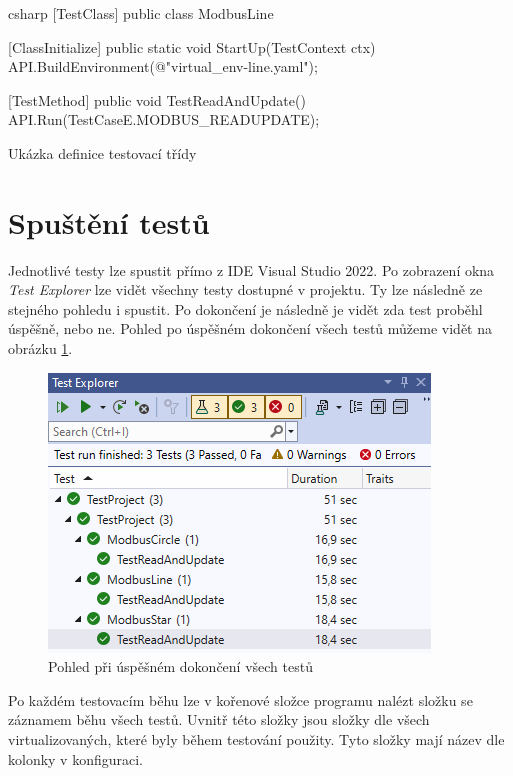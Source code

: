 \begin{listing}[htbp]
    \centering
    \begin{cminted}[breaklines,autogobble, fontsize=\footnotesize]{csharp}
        [TestClass]
        public class ModbusLine
        {
    
            [ClassInitialize]
            public static void StartUp(TestContext ctx)
            {
                API.BuildEnvironment(@"virtual_env\modbus\topologies\modbus-line.yaml");
            }
    
            [TestMethod]
            public void TestReadAndUpdate()
            {
                API.Run(TestCaseE.MODBUS_READUPDATE);
            }
        }
    \end{cminted}
\caption{Ukázka definice testovací třídy}
\label{listing:test_class}
\end{listing}


\section{Spuštění testů}

Jednotlivé testy lze spustit přímo z IDE Visual Studio 2022\cite{vs2022}. Po zobrazení okna \textit{Test Explorer} lze vidět všechny testy dostupné v projektu. Ty lze následně ze stejného pohledu i spustit. Po dokončení je následně je vidět zda test proběhl úspěšně, nebo ne. Pohled po úspěšném dokončení všech testů můžeme vidět na obrázku \ref{fig:modbus_test_success}. 

\begin{figure}[htbp]
    \centering 
    \includegraphics{assets/img/modbus_test.png}
    \caption{Pohled při úspěšném dokončení všech testů}
    \label{fig:modbus_test_success}
\end{figure}

Po každém testovacím běhu lze v kořenové složce programu nalézt složku se záznamem běhu všech testů. Uvnitř této složky jsou složky dle všech virtualizovaných, které byly během testování použity. Tyto složky mají název dle kolonky  v konfiguraci. 

